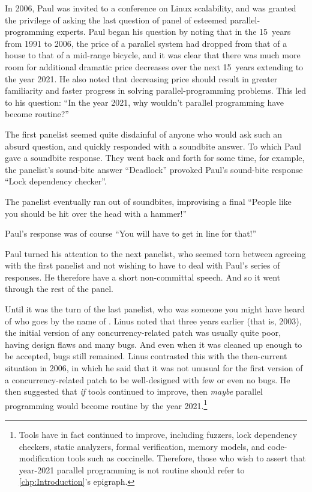 In 2006, Paul was invited to a conference on Linux scalability, and was
granted the privilege of asking the last question of panel of esteemed
parallel-programming experts.
Paul began his question by noting that in the 15~years from 1991 to 2006,
the price of a parallel system had dropped from that of a house to that
of a mid-range bicycle, and it was clear that there was much more room
for additional dramatic price decreases over the next 15~years
extending to the year 2021.
He also noted that decreasing price should result in greater familiarity
and faster progress in solving parallel-programming problems.
This led to his question:
``In the year 2021, why wouldn't parallel programming have become routine?''

The first panelist seemed quite disdainful of anyone who would ask such
an absurd question, and quickly responded with a soundbite answer.
To which Paul gave a soundbite response.
They went back and forth for some time, for example, the panelist's
sound-bite answer ``Deadlock'' provoked Paul's sound-bite response ``Lock
dependency checker''.

The panelist eventually ran out of soundbites, improvising a final
``People like you should be hit over the head with a hammer!''

Paul's response was of course ``You will have to get in line for that!''

Paul turned his attention to the next panelist, who seemed torn between
agreeing with the first panelist and not wishing to have to deal with
Paul's series of responses.
He therefore have a short non-committal speech.
And so it went through the rest of the panel.

Until it was the turn of the last panelist, who was someone you might have
heard of who goes by the name of .
Linus noted that three years earlier (that is, 2003), the initial version
of any concurrency-related patch was usually quite poor, having design
flaws and many bugs.
And even when it was cleaned up enough to be accepted, bugs still
remained.
Linus contrasted this with the then-current situation in 2006, in which
he said that it was not unusual for the first version of a concurrency-related
patch to be well-designed with few or even no bugs.
He then suggested that \emph{if} tools continued to improve, then \emph{maybe}
parallel programming would become routine by the year 2021.\footnote{
	Tools have in fact continued to improve, including fuzzers,
	lock dependency checkers, static analyzers, formal verification,
	memory models, and code-modification tools such as coccinelle.
	Therefore, those who wish to assert that year-2021
	parallel programming is not routine should refer to
	\cref{chp:Introduction}'s epigraph.}

